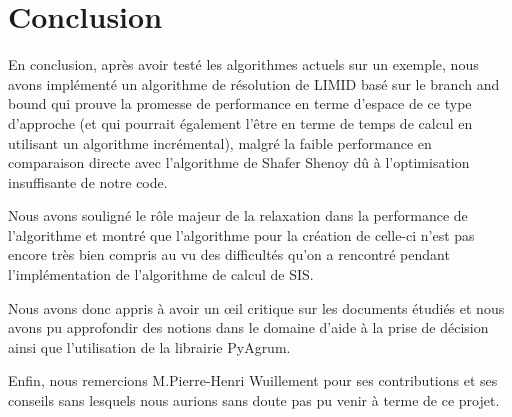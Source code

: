 \documentclass[12pt]{article}
\begin{document}
\section{Conclusion}
En conclusion, après avoir testé les algorithmes actuels sur un exemple, nous avons implémenté un algorithme de résolution de LIMID basé sur le branch and bound qui prouve la promesse de performance en terme d'espace de ce type d'approche (et qui pourrait également l'être en terme de temps de calcul en utilisant un algorithme incrémental), malgré la faible performance en comparaison directe avec l'algorithme de Shafer Shenoy dû à l'optimisation insuffisante de notre code. 

Nous avons souligné le rôle majeur de la relaxation dans la performance de l'algorithme et montré que l'algorithme pour la création de celle-ci n'est pas encore très bien compris au vu des difficultés qu'on a rencontré pendant l'implémentation de l'algorithme de calcul de SIS.

Nous avons donc appris à avoir un œil critique sur les documents étudiés et nous avons pu approfondir des notions dans le domaine d'aide à la prise de décision ainsi que l'utilisation de la librairie PyAgrum.

Enfin, nous remercions M.Pierre-Henri Wuillement pour ses contributions et ses conseils sans lesquels nous aurions sans doute pas pu venir à terme de ce projet.
 



\newpage
\end{document}
